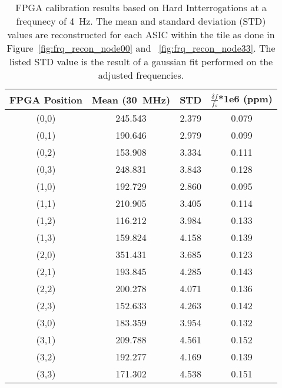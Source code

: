 \begin{table}
	\begin{center}
		\begin{tabular}{|c|c|c|c|}
			\hline
			FPGA Position & Mean (30~\unit{MHz}) & STD & $\frac{\delta f}{f_{o}}$*1e6 (ppm) \\
			\hline
			(0,0) & 245.543 & 2.379 & 0.079 \\
			\hline
			(0,1) & 190.646 & 2.979 & 0.099 \\
			\hline
			(0,2) & 153.908 & 3.334 & 0.111 \\
			\hline
			(0,3) & 248.831 & 3.843 & 0.128 \\
			\hline
			(1,0) & 192.729 & 2.860 & 0.095 \\
			\hline
			(1,1) & 210.905 & 3.405 & 0.114 \\
			\hline
			(1,2) & 116.212 & 3.984 & 0.133 \\
			\hline
			(1,3) & 159.824 & 4.158 & 0.139 \\
			\hline
			(2,0) & 351.431 & 3.685 & 0.123 \\
			\hline
			(2,1) & 193.845 & 4.285 & 0.143 \\
			\hline
			(2,2) & 200.278 & 4.071 & 0.136 \\
			\hline
			(2,3) & 152.633 & 4.263 & 0.142 \\
			\hline
			(3,0) & 183.359 & 3.954 & 0.132 \\
			\hline
			(3,1) & 209.788 & 4.561 & 0.152 \\
			\hline
			(3,2) & 192.277 & 4.169 & 0.139 \\
			\hline
			(3,3) & 171.302 & 4.538 & 0.151 \\
			\hline
		\end{tabular}
	\end{center}
	\caption{FPGA calibration results based on Hard Intterrogations at a frequnecy of 4~\unit{Hz}.
	The mean and standard deviation (STD) values are reconstructed for each ASIC within the tile as done in Figure~\ref{fig:frq_recon_node00} and ~\ref{fig:frq_recon_node33}.
	The listed STD value is the result of a gaussian fit performed on the adjusted frequencies.
	}
	\label{tab:fpga_calibration}
\end{table}